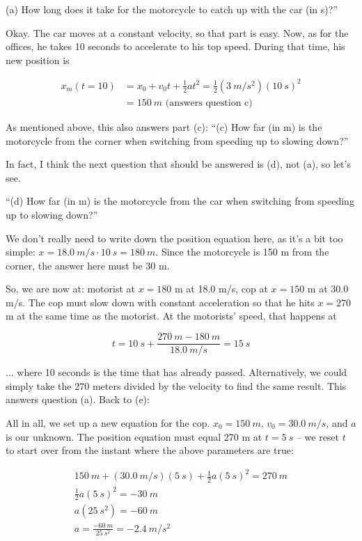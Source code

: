 \documentclass[8.01x]{subfiles}
\begin{document}
(a) How long does it take for the motorcycle to catch up with the car (in s)?''

Okay. The car moves at a constant velocity, so that part is easy. Now, as for the offices, he takes 10 seconds to accelerate to his top speed. During that time, his new position is

\begin{align}
x_m(t=10) &= x_0 + v_0 t + \frac{1}{2} a t^2 = \frac{1}{2} (\SI{3}{m/s^2}) (\SI{10}{s})^2\\
          &= \SI{150}{m} \text{ (answers question c)}
\end{align}

As mentioned above, this also  answers part (c): ``(c) How far (in m) is the motorcycle from the corner when switching from speeding up to slowing down?''

In fact, I think the next question that should be answered is (d), not (a), so let's see.

``(d) How far (in m) is the motorcycle from the car when switching from speeding up to slowing down?''

We don't really need to write down the position equation here, as it's a bit too simple: $x = \SI{18.0}{m/s} \cdot \SI{10}{s} = \SI{180}{m}$. Since the motorcycle is 150 m from the corner, the answer here must be 30 m.

So, we are now at: motorist at $x = 180$ m at 18.0 m/s, cop at $x = 150$ m at 30.0 m/s. The cop must slow down with constant acceleration so that he hits $x = 270$ m at the same time as the motorist. At the motorists' speed, that happens at

\begin{equation}
t = \SI{10}{s} + \frac{\SI{270}{m} - \SI{180}{m}}{\SI{18.0}{m/s}} = \SI{15}{s}
\end{equation}

... where 10 seconds is the time that has already passed. Alternatively, we could simply take the 270 meters divided by the velocity to find the same result. This answers question (a). Back to (e):

All in all, we set up a new equation for the cop. $x_0 = \SI{150}{m}$, $v_0 = \SI{30.0}{m/s}$, and $a$ is our unknown. The position equation must equal 270 m at $t = \SI{5}{s}$ -- we reset $t$ to start over from the instant where the above parameters are true:

\begin{align}
\SI{150}{m} + (\SI{30.0}{m/s})(\SI{5}{s}) + \frac{1}{2} a (\SI{5}{s})^2 = \SI{270}{m}\\
\frac{1}{2} a (\SI{5}{s})^2 = \SI{-30}{m}\\
a (\SI{25}{s^2}) = \SI{-60}{m}\\
a  = \frac{\SI{-60}{m}}{\SI{25}{s^2}} = \SI{-2.4}{m/s^2}
\end{align}
\end{document}
